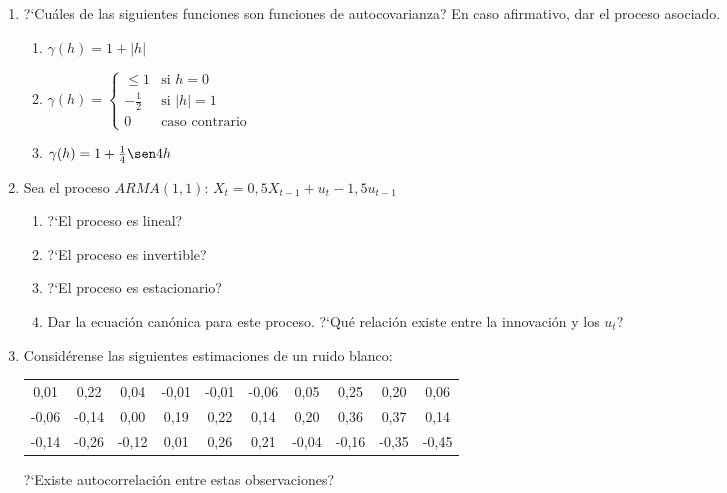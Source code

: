 \begin{enumerate}[resume]
\item ?`Cu\'{a}les de las siguientes funciones son funciones de autocovarianza? En caso afirmativo, dar el proceso asociado.
	\begin{enumerate}
	\item $\gamma (h)=1+\left| h \right|$
	\item $\gamma (h)=\begin{cases}\le
	                   1 &\text{si } h=0\\
	                   -\frac{1}{2} &\text{si } \left| h \right|=1 \\
	                   0 &\text{caso contrario}
	                  \end{cases}$
	\item $\gamma (h)=1+\frac{1}{4}\sen 4h$
	\end{enumerate}
\item Sea el proceso $ARMA (1, 1)$: $X_{t}=0,5X_{t-1} +u_{t} -1,5  u_{t-1} $
	\begin{enumerate}
	\item ?`El proceso es lineal?
	\item ?`El proceso es invertible?
	\item ?`El proceso es estacionario?
	\item Dar la ecuaci\'{o}n can\'{o}nica para este proceso. ?`Qu\'{e} relaci\'{o}n existe entre la innovaci\'{o}n y los $u_{{t}}$?
	\end{enumerate}
\item Consid\'{e}rense las siguientes estimaciones de un ruido blanco:
\begin{center}
 \begin{tabular}{cccccccccc}
0,01& 0,22& 0,04& -0,01& -0,01& -0,06& 0,05& 0,25& 0,20& 0,06 \\
-0,06& -0,14& 0,00& 0,19& 0,22& 0,14& 0,20& 0,36& 0,37& 0,14 \\
-0,14& -0,26& -0,12& 0,01& 0,26& 0,21& -0,04& -0,16& -0,35& -0,45
\end{tabular}
\end{center}

?`Existe autocorrelaci\'{o}n entre estas observaciones?
\end{enumerate}
